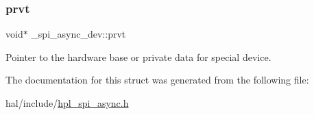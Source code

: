 \subsubsection{\texorpdfstring{prvt}{prvt}}
{\footnotesize\ttfamily void$\ast$ \+\_\+spi\+\_\+async\+\_\+dev\+::prvt}

Pointer to the hardware base or private data for special device. 

The documentation for this struct was generated from the following file\+:\begin{DoxyCompactItemize}
\item 
hal/include/\hyperlink{hpl__spi__async_8h}{hpl\+\_\+spi\+\_\+async.\+h}\end{DoxyCompactItemize}
